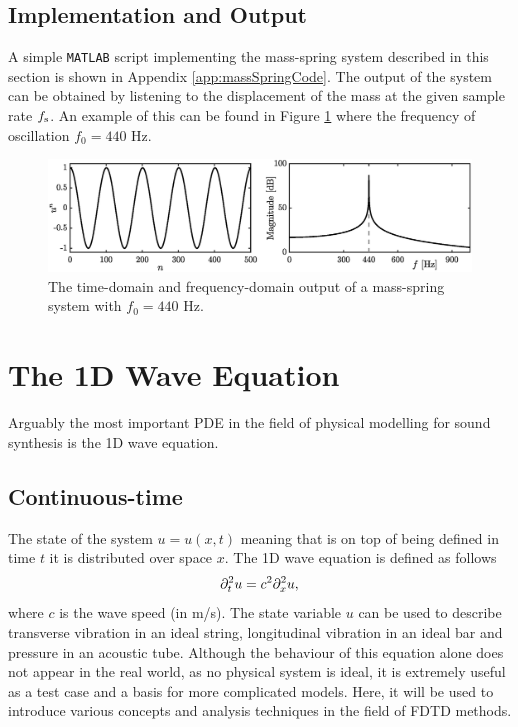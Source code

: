 \subsection{Implementation and Output}
A simple \texttt{MATLAB} script implementing the mass-spring system described in this section is shown in Appendix \ref{app:massSpringCode}. The output of the system can be obtained by listening to the displacement of the mass at the given sample rate $f_\text{s}$. An example of this can be found in Figure \ref{fig:massSpringOutput} where the frequency of oscillation $f_0 = 440$ Hz.

\begin{figure}[ht]
    \includegraphics[width=\textwidth]{figures/fdtd/massSpringOutput.eps}
    \caption{The time-domain and frequency-domain output of a mass-spring system with $f_0 = 440$ Hz. \label{fig:massSpringOutput}}
\end{figure}



\section{%
The 1D Wave Equation}
Arguably the most important PDE in the field of physical modelling for sound synthesis is the 1D wave equation.
\subsection{Continuous-time}
The state of the system $u=u(x,t)$ meaning that is on top of being defined in time $t$ it is distributed over space $x$. The 1D wave equation is defined as follows
\begin{equation}\label{eq:1DwavePDE}
    \partial_t^2 u = c^2 \partial_x^2 u,
\end{equation}
where $c$ is the wave speed (in m/s). The state variable $u$ can be used to describe transverse vibration in an ideal string, longitudinal vibration in an ideal bar and pressure in an acoustic tube. Although the behaviour of this equation alone does not appear in the real world, as no physical system is ideal, it is extremely useful as a test case and a basis for more complicated models. Here, it will be used to introduce various concepts and analysis techniques in the field of FDTD methods.

